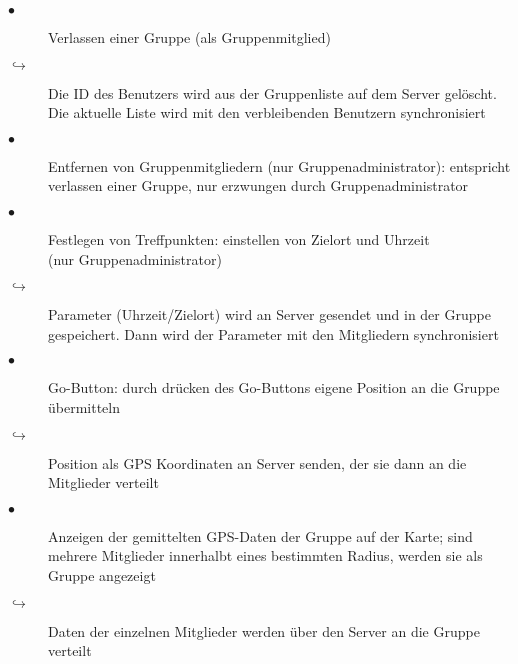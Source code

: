 \documentclass{scrartcl}
\begin{document}
\begin{description}
\item[$\bullet$] Verlassen einer Gruppe (als Gruppenmitglied)
\item[$\hookrightarrow$] Die ID des Benutzers wird aus der Gruppenliste auf dem Server gelöscht. Die aktuelle Liste wird mit den verbleibenden Benutzern synchronisiert
\item[$\bullet$] Entfernen von Gruppenmitgliedern (nur Gruppenadministrator): entspricht verlassen einer Gruppe, nur erzwungen durch Gruppenadministrator
\item[$\bullet$] Festlegen von Treffpunkten: einstellen von Zielort und Uhrzeit\\(nur Gruppenadministrator)
\item[$\hookrightarrow$] Parameter (Uhrzeit/Zielort) wird an Server gesendet und in der Gruppe gespeichert. Dann wird der Parameter mit den Mitgliedern synchronisiert
\item[$\bullet$] Go-Button: durch drücken des Go-Buttons eigene Position an die Gruppe übermitteln
\item[$\hookrightarrow$] Position als GPS Koordinaten an Server senden, der sie dann an die Mitglieder verteilt
\item[$\bullet$] Anzeigen der gemittelten GPS-Daten der Gruppe auf der Karte; sind mehrere Mitglieder innerhalbt eines bestimmten Radius,
     werden sie als Gruppe angezeigt
\item[$\hookrightarrow$] Daten der einzelnen Mitglieder werden über den Server an die Gruppe verteilt
\end{description}
\end{document}
